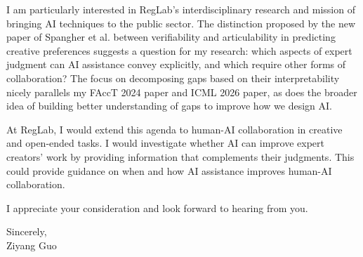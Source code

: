 I am particularly interested in RegLab's interdisciplinary research and mission of bringing AI techniques to the public sector.
The distinction proposed by the new paper of Spangher et al. between verifiability and articulability in predicting creative preferences suggests a question for my research: which aspects of expert judgment can AI assistance convey explicitly, and which require other forms of collaboration?
The focus on decomposing gaps based on their interpretability nicely parallels my FAccT 2024 paper and ICML 2026 paper, as does the broader idea of building better understanding of gaps to improve how we design AI.


At RegLab, I would extend this agenda to human-AI collaboration in creative and open-ended tasks.
I would investigate whether AI can improve expert creators' work by providing information that complements their judgments.
This could provide guidance on when and how AI assistance improves human-AI collaboration.

I appreciate your consideration and look forward to hearing from you.

Sincerely,\\
Ziyang Guo
